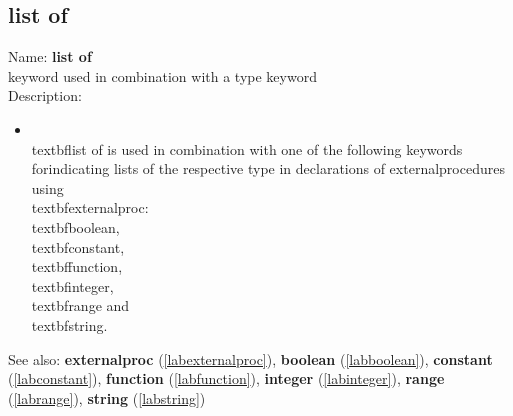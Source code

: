 \subsection{list of}
\label{lablistof}
\noindent Name: \textbf{list of}\\
keyword used in combination with a type keyword\\
\noindent Description: \begin{itemize}

\item \\textbf{list of} is used in combination with one of the following keywords for\n   indicating lists of the respective type in declarations of external\n   procedures using \\textbf{externalproc}: \\textbf{boolean}, \\textbf{constant}, \\textbf{function},\n   \\textbf{integer}, \\textbf{range} and \\textbf{string}.\n\end{itemize}
See also: \textbf{externalproc} (\ref{labexternalproc}), \textbf{boolean} (\ref{labboolean}), \textbf{constant} (\ref{labconstant}), \textbf{function} (\ref{labfunction}), \textbf{integer} (\ref{labinteger}), \textbf{range} (\ref{labrange}), \textbf{string} (\ref{labstring})
